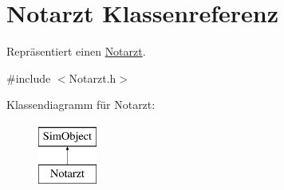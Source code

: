 \hypertarget{classNotarzt}{}\section{Notarzt Klassenreferenz}
\label{classNotarzt}


Repräsentiert einen \hyperlink{classNotarzt}{Notarzt}.  




{\ttfamily \#include $<$Notarzt.\+h$>$}

Klassendiagramm für Notarzt\+:\begin{figure}[H]
\begin{center}
\leavevmode
\includegraphics[height=2.000000cm]{classNotarzt}
\end{center}
\end{figure}
